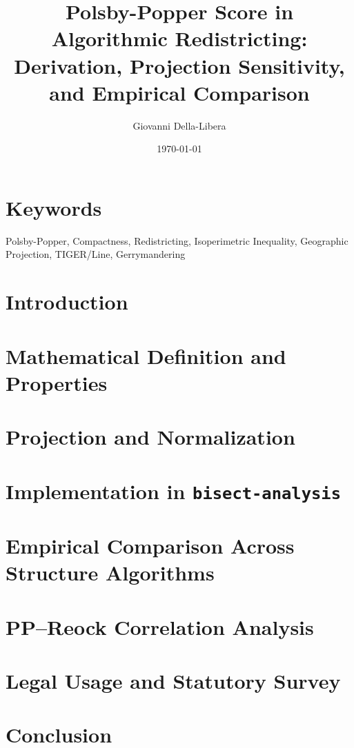 \documentclass[12pt]{article}
\title{\textbf{Polsby-Popper Score in Algorithmic Redistricting:\\
Derivation, Projection Sensitivity, and Empirical Comparison}}
\author{Giovanni Della-Libera}
\date{\today}
\begin{document}
\maketitle

\begin{abstract}

\end{abstract}

\section*{Keywords}
Polsby-Popper, Compactness, Redistricting, Isoperimetric Inequality,
Geographic Projection, TIGER/Line, Gerrymandering

\section{Introduction}


\section{Mathematical Definition and Properties}


\section{Projection and Normalization}


\section{Implementation in \texttt{bisect-analysis}}


\section{Empirical Comparison Across Structure Algorithms}


\section{PP--Reock Correlation Analysis}


\section{Legal Usage and Statutory Survey}


\section{Conclusion}




\end{document}
